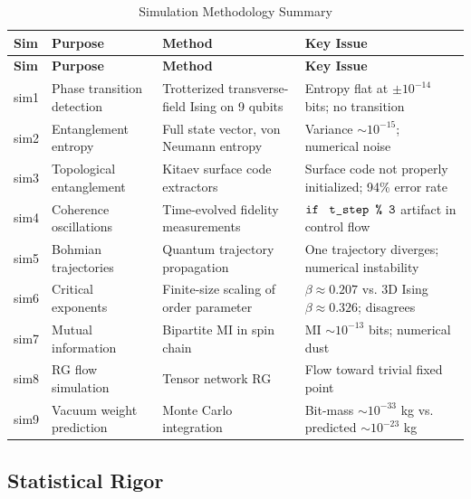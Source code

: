 \documentclass[11pt,a4paper]{article}
\begin{document}
\begin{longtable}{p{2cm}p{5cm}p{4cm}p{3.5cm}}
\caption{Simulation Methodology Summary} \\
\toprule
\textbf{Sim} & \textbf{Purpose} & \textbf{Method} & \textbf{Key Issue} \\
\midrule
\endfirsthead
\toprule
\textbf{Sim} & \textbf{Purpose} & \textbf{Method} & \textbf{Key Issue} \\
\midrule
\endhead
\bottomrule
\endfoot
sim1 & Phase transition detection & Trotterized transverse-field Ising on 9 qubits & Entropy flat at $\pm 10^{-14}$ bits; no transition \\
sim2 & Entanglement entropy & Full state vector, von Neumann entropy & Variance $\sim 10^{-15}$; numerical noise \\
sim3 & Topological entanglement & Kitaev surface code extractors & Surface code not properly initialized; 94\% error rate \\
sim4 & Coherence oscillations & Time-evolved fidelity measurements & $\texttt{if\; t\_step \% 3}$ artifact in control flow \\
sim5 & Bohmian trajectories & Quantum trajectory propagation & One trajectory diverges; numerical instability \\
sim6 & Critical exponents & Finite-size scaling of order parameter & $\beta \approx 0.207$ vs. 3D Ising $\beta \approx 0.326$; disagrees \\
sim7 & Mutual information & Bipartite MI in spin chain & MI $\sim 10^{-13}$ bits; numerical dust \\
sim8 & RG flow simulation & Tensor network RG & Flow toward trivial fixed point \\
sim9 & Vacuum weight prediction & Monte Carlo integration & Bit-mass $\sim 10^{-33}$ kg vs. predicted $\sim 10^{-23}$ kg \\
\end{longtable}

\subsection{Statistical Rigor}
\end{document}
